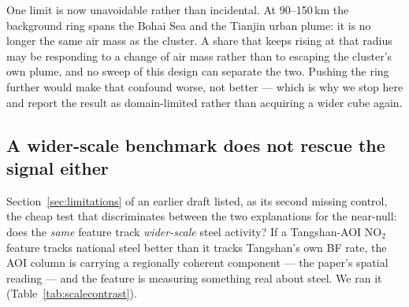\documentclass[11pt,a4paper]{article}
\providecommand{\ce}[1]{\ensuremath{\mathrm{#1}}}
\begin{document}
One limit is now unavoidable rather than incidental. At 90--150\,km the background ring spans the
Bohai Sea and the Tianjin urban plume: it is no longer the same air mass as the cluster. A share
that keeps rising at that radius may be responding to a change of air mass rather than to escaping
the cluster's own plume, and no sweep of this design can separate the two. Pushing the ring further
would make that confound worse, not better --- which is why we stop here and report the result as
domain-limited rather than acquiring a wider cube again.

\subsection{A wider-scale benchmark does not rescue the signal either}
\label{sec:scalecontrast}

Section~\ref{sec:limitations} of an earlier draft listed, as its second missing control, the cheap
test that discriminates between the two explanations for the near-null: does the \emph{same}
feature track \emph{wider-scale} steel activity? If a Tangshan-AOI \ce{NO_2} feature tracks national
steel better than it tracks Tangshan's own BF rate, the AOI column is carrying a regionally
coherent component --- the paper's spatial reading --- and the feature is measuring something real
about steel. We ran it (Table~\ref{tab:scalecontrast}).
\end{document}

